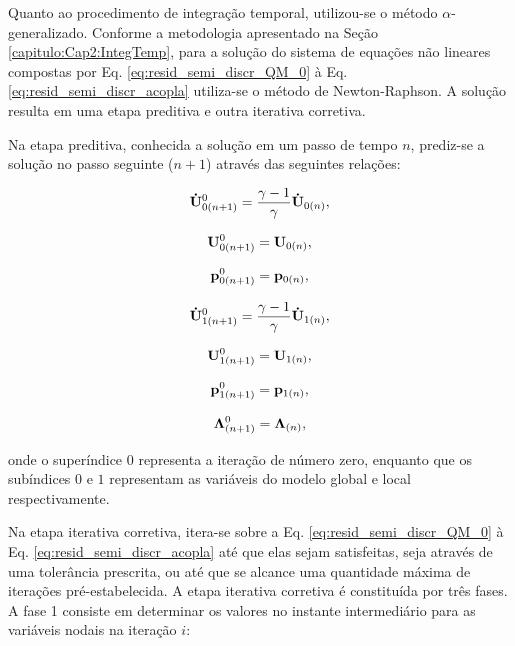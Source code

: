 \documentclass[tese_patricia]{subfiles}
\begin{document}
Quanto ao procedimento de integração temporal, utilizou-se o método $\alpha$-generalizado. Conforme a metodologia apresentado na Seção \ref{capitulo:Cap2:IntegTemp}, para a solução do sistema de equações não lineares compostas por Eq. \eqref{eq:resid_semi_discr_QM_0} à Eq. \eqref{eq:resid_semi_discr_acopla} utiliza-se o método de Newton-Raphson. A solução resulta em uma etapa preditiva e outra iterativa corretiva.

Na etapa preditiva, conhecida a solução em um passo de tempo $n$, prediz-se a solução no passo seguinte ($n+1$) através das seguintes relações:

\begin{align}
	\mathbf{\dot{U}}_{0(n+1)}^{0} = \frac{\gamma-1}{\gamma}\mathbf{\dot{U}}_{0(n)} \label{eq:pred_acel_0},
\end{align}

\begin{align}
	\mathbf{U}_{0(n+1)}^{0} = \mathbf{U}_{0(n)}, \label{eq:pred_vel_0}
\end{align}

\begin{align}
	\mathbf{p}_{0(n+1)}^{0} = \mathbf{p}_{0(n)},\label{eq:pred_press_0}
\end{align}

\begin{align}
	\mathbf{\dot{U}}_{1(n+1)}^{0} = \frac{\gamma-1}{\gamma}\mathbf{\dot{U}}_{1(n)} \label{eq:pred_acel_1},
\end{align}

\begin{align}
	\mathbf{U}_{1(n+1)}^{0} = \mathbf{U}_{1(n)}, \label{eq:pred_vel_1}
\end{align}

\begin{align}
	\mathbf{p}_{1(n+1)}^{0} = \mathbf{p}_{1(n)},\label{eq:pred_press_1}
\end{align}

\begin{align}
	\boldsymbol{\Lambda}_{(n+1)}^{0} = \boldsymbol{\Lambda}_{(n)},\label{eq:pred_lag_mult}
\end{align}

\noindent onde o superíndice $0$ representa a iteração de número zero, enquanto que os subíndices $0$ e $1$ representam as variáveis do modelo global e local respectivamente.

Na etapa iterativa corretiva, itera-se sobre a Eq. \eqref{eq:resid_semi_discr_QM_0} à Eq. \eqref{eq:resid_semi_discr_acopla} até que elas sejam satisfeitas, seja através de uma tolerância prescrita, ou até que se alcance uma quantidade máxima de iterações pré-estabelecida. A etapa iterativa corretiva é constituída por três fases. A fase 1 consiste em determinar os valores no instante intermediário para as variáveis nodais na iteração $i$:
\end{document}
